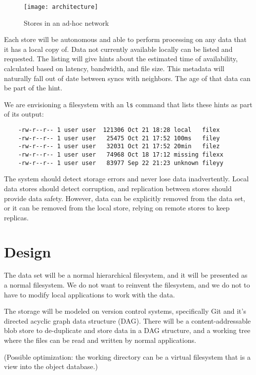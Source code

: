 \documentclass[a4paper]{article}
\begin{document}
\begin{figure}[h]
  \caption{Stores in an ad-hoc network}
  \label{fig:architecture}
  \centering
    \texttt{[image: architecture]}
\end{figure}

Each store will be autonomous and able to perform processing on any data that it
has a local copy of. Data not currently available locally can be listed and
requested. The listing will give hints about the estimated time of availability,
calculated based on latency, bandwidth, and file size. This metadata will
naturally fall out of date between syncs with neighbors. The age of that data
can be part of the hint.

We are envisioning a filesystem with an \lstinline{ls} command that lists these
hints as part of its output:

\begin{lstlisting}
    -rw-r--r-- 1 user user  121306 Oct 21 18:28 local   filex
    -rw-r--r-- 1 user user   25475 Oct 21 17:52 100ms   filey
    -rw-r--r-- 1 user user   32031 Oct 21 17:52 20min   filez
    -rw-r--r-- 1 user user   74968 Oct 18 17:12 missing filexx
    -rw-r--r-- 1 user user   83977 Sep 22 21:23 unknown fileyy
\end{lstlisting}

The system should detect storage errors and never lose data inadvertently. Local
data stores should detect corruption, and replication between stores should
provide data safety. However, data can be explicitly removed from the data set,
or it can be removed from the local store, relying on remote stores to keep
replicas.


\section{Design}\label{design}

The data set will be a normal hierarchical filesystem, and it will be presented
as a normal filesystem. We do not want to reinvent the filesystem, and we do not
to have to modify local applications to work with the data.

The storage will be modeled on version control systems, specifically Git and
it's directed acyclic graph data structure (DAG). There will be a
content-addressable blob store to de-duplicate and store data in a DAG
structure, and a working tree where the files can be read and written by normal
applications.

(Possible optimization: the working directory can be a virtual filesystem that
is a view into the object database.)
\end{document}
